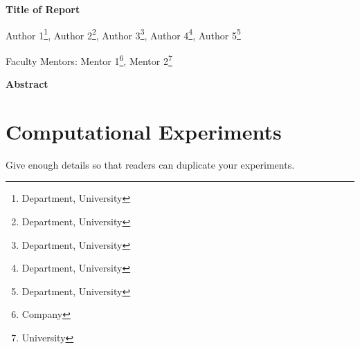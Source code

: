 \documentclass[10pt]{article}
\begin{document}
\centerline{\large \bf Title of Report}

\vspace{.1truein}

\def\thefootnote{\arabic{footnote}}
\begin{center}
  Author 1\footnote{Department, University},
  Author 2\footnote{Department, University},
  Author 3\footnote{Department, University},
  Author 4\footnote{Department, University},
  Author 5\footnote{Department, University}
\end{center}
\def\PM{{\mathrm{PM_{2.5}}}} 


\begin{center}
Faculty Mentors: Mentor 1\footnote{Company},
Mentor 2\footnote{University}
\end{center}


\vspace{.3truein}
\centerline{\bf Abstract}



\section{Computational Experiments}
Give enough details so that readers can duplicate your experiments.
\end{document}
